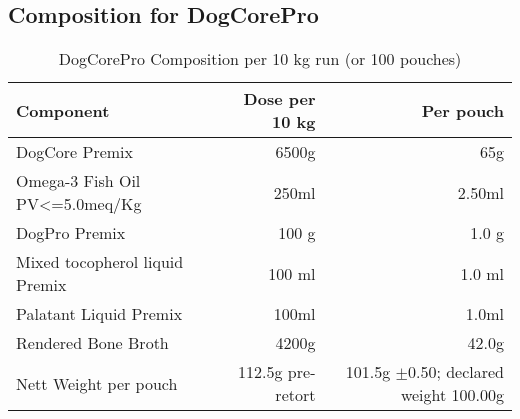 \subsection*{Composition for DogCorePro}
\begin{table}[h]
\centering
\caption{DogCorePro Composition per 10 kg run (or 100 pouches)}
\label{tab:dogcore_composition_}
\begin{tabular}{@{}l r r@{}}
\toprule
\textbf{Component} & \textbf{Dose per 10 kg} & \textbf{Per pouch} \\
\midrule
DogCore Premix & 6500g & 65g \\ [3pt]
Omega-3 Fish Oil PV<=5.0meq/Kg & 250ml & 2.50ml \\[3pt]
DogPro Premix & 100 g & 1.0 g \\[3pt]
Mixed tocopherol liquid Premix & 100 ml & 1.0 ml \\[3pt]
Palatant Liquid Premix & 100ml & 1.0ml \\[3pt]
\midrule
Rendered Bone Broth & 4200g & 42.0g \\[3pt]
\midrule
Nett Weight per pouch & 112.5g pre-retort & 101.5g $\pm$0.50; declared weight 100.00g\\[3pt]
\bottomrule
\bottomrule
\end{tabular}
\end{table}
\vspace{1em}

